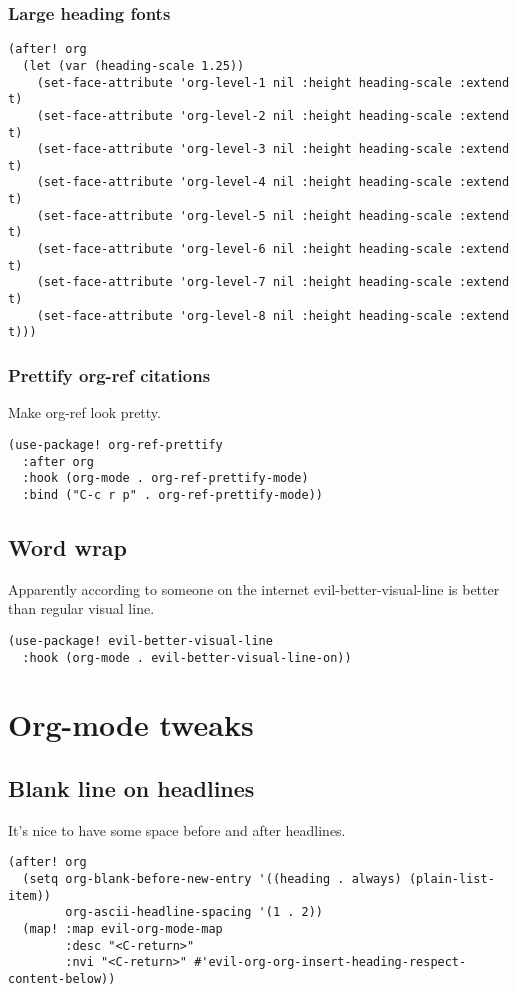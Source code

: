 \documentclass[11pt]{article}
\begin{document}
\subsubsection{Large heading fonts}
\label{sec:org43be297}
\begin{verbatim}
(after! org
  (let (var (heading-scale 1.25))
    (set-face-attribute 'org-level-1 nil :height heading-scale :extend t)
    (set-face-attribute 'org-level-2 nil :height heading-scale :extend t)
    (set-face-attribute 'org-level-3 nil :height heading-scale :extend t)
    (set-face-attribute 'org-level-4 nil :height heading-scale :extend t)
    (set-face-attribute 'org-level-5 nil :height heading-scale :extend t)
    (set-face-attribute 'org-level-6 nil :height heading-scale :extend t)
    (set-face-attribute 'org-level-7 nil :height heading-scale :extend t)
    (set-face-attribute 'org-level-8 nil :height heading-scale :extend t)))
\end{verbatim}

\subsubsection{Prettify org-ref citations}
\label{sec:orgcd6ff0e}
Make org-ref look pretty.
\begin{verbatim}
(use-package! org-ref-prettify
  :after org
  :hook (org-mode . org-ref-prettify-mode)
  :bind ("C-c r p" . org-ref-prettify-mode))
\end{verbatim}

\subsection{Word wrap}
\label{sec:org852ca38}
Apparently according to someone on the internet evil-better-visual-line is better than regular visual line.
\begin{verbatim}
(use-package! evil-better-visual-line
  :hook (org-mode . evil-better-visual-line-on))
\end{verbatim}

\section{Org-mode tweaks}
\label{sec:org42b2b89}

\subsection{Blank line on headlines}
\label{sec:org510cf99}
It's nice to have some space before and after headlines.
\begin{verbatim}
(after! org
  (setq org-blank-before-new-entry '((heading . always) (plain-list-item))
        org-ascii-headline-spacing '(1 . 2))
  (map! :map evil-org-mode-map
        :desc "<C-return>"
        :nvi "<C-return>" #'evil-org-org-insert-heading-respect-content-below))
\end{verbatim}
\end{document}
